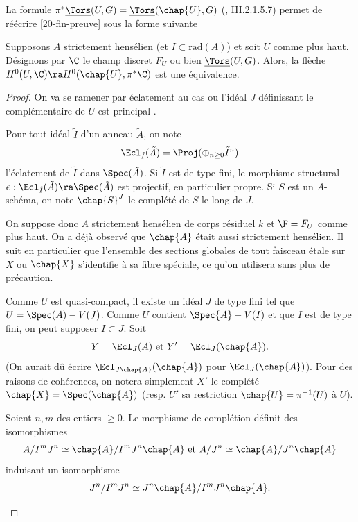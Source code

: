 \documentclass[10pt]{../fichiers-configuration-latex/smfart}
\begin{document}
La formule $\pi^*\underline{\Tors}(U,G)=\underline{\Tors}(\chap{U},G)$ (\cite{CNA@Giraud},
III.2.1.5.7) permet de réécrire \ref{20-fin-preuve} sous la forme suivante

\begin{proposition2}\label{20-fin-preuvebis}Supposons $A$ strictement hensélien (et
$I\subset\text{rad}(A)$) et soit $U$ comme plus haut. Désignons par $\C$ le champ discret $F_U$ ou
bien $\underline{\Tors}(U,G)$. Alors, la flèche $H^0(U,\C)\ra H^0(\chap{U},\pi^*\C)$ est une
équivalence.  \end{proposition2}

\begin{proof} On va se ramener par éclatement au cas ou l'idéal $J$ définissant le complémentaire de
$U$ est principal .

Pour tout idéal ${\tilde I}$ d'un anneau ${\tilde A}$, on note $$\Ecl_{{\tilde I}}({\tilde
A})=\Proj(\oplus_{n\geq 0}\tilde I^n)$$ l'éclatement de ${\tilde I}$ dans $\Spec(\tilde A)$.
Si ${\tilde I}$ est de type fini, le morphisme structural $e:\Ecl_{{\tilde I}}({\tilde
A})\ra\Spec(\tilde A)$ est projectif, en particulier propre. Si $S$ est un $A$-schéma, on note
$\chap{S}^J$ le complété de $S$ le long de $J$.


On suppose donc $A$ strictement hensélien de corps résiduel $k$ et $\F=F_U$ comme plus haut. On a
déjà observé que $\chap{A}$ était aussi strictement hensélien. Il suit en particulier que l'ensemble
des sections globales de tout faisceau étale sur $X$ ou $\chap{X}$ s'identifie à sa fibre spéciale,
ce qu'on utilisera sans plus de précaution.

Comme $U$ est quasi-compact, il existe un idéal $J$ de type fini tel que $U=\Spec(A)-V(J)$. Comme
$U$ contient $\Spec{A}-V(I)$ et que $I$ est de type fini, on peut supposer $I\subset J$.  Soit
$$Y=\Ecl_J(A)\text{ et }Y'=\Ecl_J(\chap{A}).$$ (On aurait dû écrire $\Ecl_{J\chap{A}}(\chap{A})$ pour
$\Ecl_J(\chap{A})$).  Pour des raisons de cohérences, on notera simplement $X'$ le complété
$\chap{X}=\Spec(\chap{A})$ (resp. $U'$ sa restriction $\chap{U}=\pi^{-1}(U)$ à $U$).

\begin{sous-lemme2}\label{20-compa-comple}Soient $n,m$ des entiers $\geq 0$. Le morphisme de
complétion définit des isomorphismes $$A/I^mJ^n\simeq \chap{A}/I^mJ^n\chap{A}\text{ et }A/J^n\simeq
\chap{A}/J^n\chap{A}$$ induisant un isomorphisme \begin{equation*} J^n/I^mJ^n\simeq
J^n\chap{A}/I^mJ^n\chap{A}.  \end{equation*} \end{sous-lemme2}


\end{proof}
\end{document}
